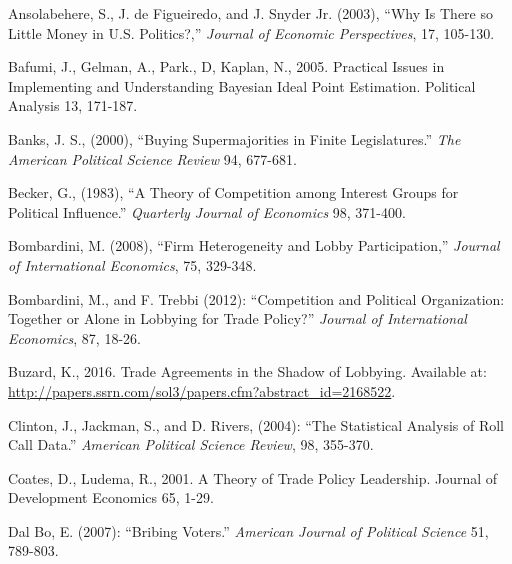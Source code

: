 \documentclass[12pt]{article}
\begin{document}
\begin{list}{}{\setlength{\leftmargin}{0.3in}\setlength{\rightmargin}{0.0in}\setlength{\itemindent}{-0.3in}\setlength{\itemsep}{0.0in}}


\item Ansolabehere, S., J. de Figueiredo, and J. Snyder Jr. (2003), ``Why Is There so Little Money in U.S. Politics?,'' {\em Journal of Economic Perspectives}, 17, 105-130.

\item Bafumi, J., Gelman, A., Park., D, Kaplan, N., 2005. Practical Issues in Implementing and Understanding Bayesian Ideal Point Estimation. Political Analysis 13, 171-187.
	
\item Banks, J. S., (2000), ``Buying Supermajorities in Finite Legislatures.'' {\em The American Political Science Review} 94, 677-681.

\item Becker, G., (1983), ``A Theory of Competition among Interest Groups for Political Influence.'' {\em Quarterly Journal of Economics} 98, 371-400.

\item Bombardini, M. (2008), ``Firm Heterogeneity and Lobby Participation,'' {\em Journal of International Economics}, 75, 329-348.

\item Bombardini, M., and F. Trebbi (2012): ``Competition and Political Organization: Together or Alone in Lobbying for Trade Policy?'' {\em Journal of International Economics}, 87, 18-26.

\begin{sloppypar}	
	\item Buzard, K., 2016. Trade Agreements in the Shadow of Lobbying. Available at: \url{http://papers.ssrn.com/sol3/papers.cfm?abstract_id=2168522}.
\end{sloppypar}

\item Clinton, J., Jackman, S., and D. Rivers, (2004): ``The Statistical Analysis of Roll Call Data.'' {\em American Political Science Review}, 98, 355-370.

\item Coates, D., Ludema, R., 2001. A Theory of Trade Policy Leadership. Journal of Development Economics 65, 1-29.
	
\item Dal Bo, E. (2007): ``Bribing Voters.'' {\em American Journal of Political Science} 51, 789-803.


\end{list}
\end{document}
